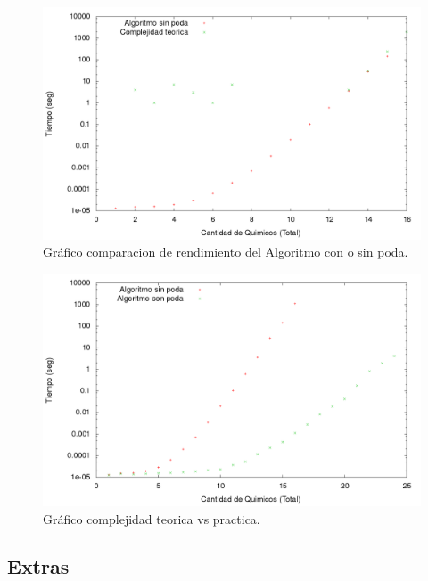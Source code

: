 \begin{figure}[H]
\begin{center}
\includegraphics[scale=.30]{./imagenes/ej3_chartComplejidad.png}
\caption{Gr\'afico comparacion de rendimiento del Algoritmo con o sin poda.}
\end{center}
\end{figure}

\begin{figure}[H]
\begin{center}
\includegraphics[scale=.30]{./imagenes/ej3_chartRendimiento.png}
\caption{Gr\'afico complejidad teorica vs practica.}
\end{center}
\end{figure}



\subsection{Extras}

